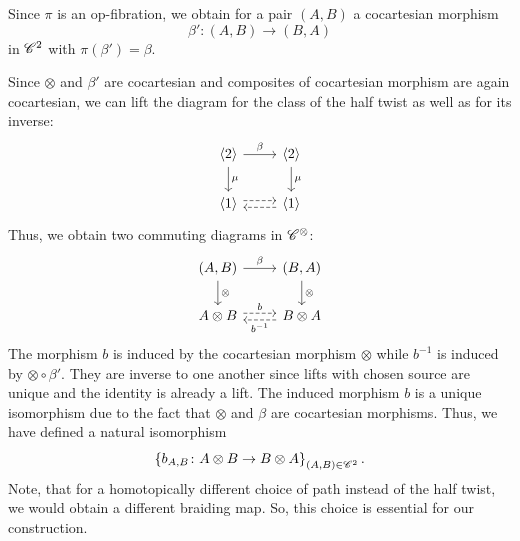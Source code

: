 \begin{const}
\begin{center}
\end{center}

Since $\pi$ is an op-fibration, we obtain for a pair $(A,B)$ a cocartesian
morphism $$\beta' \colon (A,B) \to (B,A)$$ in $\mathscr{C}^2$ with $\pi(\beta')=\beta$.


Since $\otimes$ and $\beta'$ are cocartesian and composites of cocartesian
morphism are again cocartesian, we can lift the diagram for the class of the
half twist as well as for its inverse:
\[    
    \begin{tikzcd}
        \langle 2 \rangle \arrow[r, "\beta"] \arrow[d, "\mu"] & \langle 2 \rangle \arrow[d, "\mu"] \\
        \langle 1 \rangle  \arrow[r, dashed, shift left]                  & \langle 1 \rangle \arrow[l, dashed, shift left]                
    \end{tikzcd}
\]
Thus, we obtain two commuting diagrams in $\mathscr{C}^{\otimes}$:
\[
\begin{tikzcd}
{(A,B)} \arrow[r, "\beta"] \arrow[d, "\otimes"] & {(B,A)} \arrow[d, "\otimes"]                        \\
A \otimes B \arrow[r, "b", dashed, shift left]  & B \otimes A \arrow[l, "b^{-1}", dashed, shift left]
\end{tikzcd}
\]
The morphism $b$ is induced by the cocartesian morphism $\otimes$
while $b^{-1}$ is induced by $\otimes \circ \beta'$. They are inverse to one
another since lifts with chosen source are unique and the identity is already a
lift. The induced morphism $b$ is a unique isomorphism due to the fact that
$\otimes$ and $\beta$ are cocartesian morphisms. Thus, we have defined a natural
isomorphism
\[
    \left\{b_{A,B} \colon A \otimes B \to B \otimes A\right\}_{(A,B) \in \mathscr{C}^2}.
\]
Note, that for a homotopically different choice of path instead of the half
twist, we would obtain a different braiding map. So, this choice is essential
for our construction.


\end{const}
